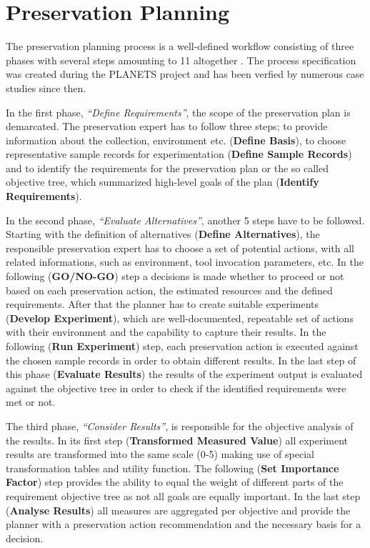 \section{Preservation Planning}
The preservation planning process is a well-defined workflow consisting of three phases with several steps amounting to 11 altogether \cite{STR07_jcdl}. The process specification was created during the PLANETS project and has been verfied by numerous case studies since then. 

In the first phase, \textit{``Define Requirements''}, the scope of the preservation plan is demarcated. The preservation expert has to follow three steps; to provide information about the collection, environment etc. (\textbf{Define Basis}), to choose representative sample records for experimentation (\textbf{Define Sample Records}) and to identify the requirements for the preservation plan or the so called objective tree, which summarized high-level goals of the plan (\textbf{Identify Requirements}). 

In the second phase, \textit{``Evaluate Alternatives''}, another 5 steps have to be followed. Starting with the definition of alternatives (\textbf{Define Alternatives}), the responsible preservation expert has to choose a set of potential actions, with all related informations, such as environment, tool invocation parameters, etc. In the following (\textbf{GO/NO-GO}) step a decisions is made whether to proceed or not based on each preservation action, the estimated resources and the defined requirements. After that the planner has to create suitable experiments (\textbf{Develop Experiment}), which are well-documented, repeatable set of actions with their environment and the capability to capture their results. In the following (\textbf{Run Experiment}) step, each preservation action is executed against the chosen sample records in order to obtain different results. In the last step of this phase (\textbf{Evaluate Results}) the results of the experiment output is evaluated against the objective tree in order to check if the identified requirements were met or not.

The third phase, \textit{``Consider Results''}, is responsible for the objective analysis of the results. In its first step (\textbf{Transformed Measured Value}) all experiment results are transformed into the same scale (0-5) making use of special transformation tables and utility function. The following (\textbf{Set Importance Factor}) step provides the ability to equal the weight of different parts of the requirement objective tree as not all goals are equally important. In the last step (\textbf{Analyse Results}) all measures are aggregated per objective and provide the planner with a preservation action recommendation and the necessary basis for a decision.

